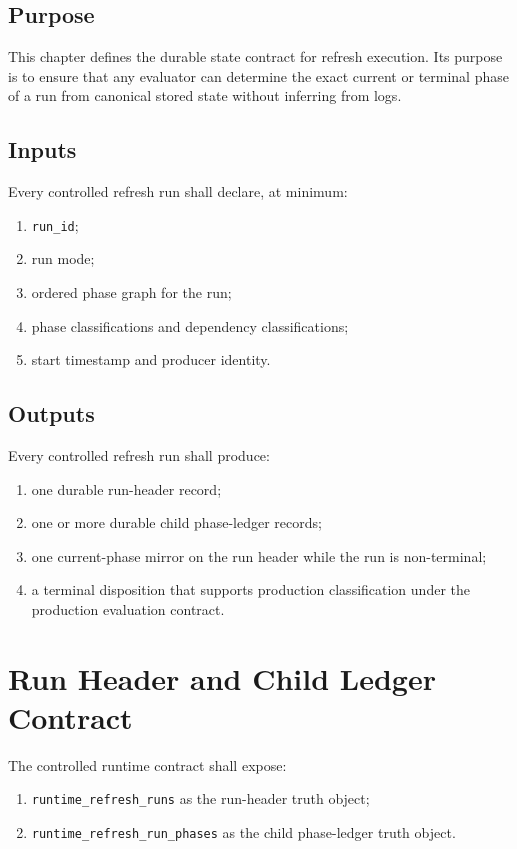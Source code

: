 \documentclass[11pt]{report}
\begin{document}
\subsection{Purpose}
This chapter defines the durable state contract for refresh execution. Its purpose is to ensure that any evaluator can determine the exact current or terminal phase of a run from canonical stored state without inferring from logs.

\subsection{Inputs}
Every controlled refresh run shall declare, at minimum:
\begin{enumerate}[leftmargin=1.2cm]
    \item \texttt{run\_id};
    \item run mode;
    \item ordered phase graph for the run;
    \item phase classifications and dependency classifications;
    \item start timestamp and producer identity.
\end{enumerate}

\subsection{Outputs}
Every controlled refresh run shall produce:
\begin{enumerate}[leftmargin=1.2cm]
    \item one durable run-header record;
    \item one or more durable child phase-ledger records;
    \item one current-phase mirror on the run header while the run is non-terminal;
    \item a terminal disposition that supports production classification under the production evaluation contract.
\end{enumerate}

\section{Run Header and Child Ledger Contract}
The controlled runtime contract shall expose:
\begin{enumerate}[leftmargin=1.2cm]
    \item \texttt{runtime\_refresh\_runs} as the run-header truth object;
    \item \texttt{runtime\_refresh\_run\_phases} as the child phase-ledger truth object.
\end{enumerate}
\end{document}
